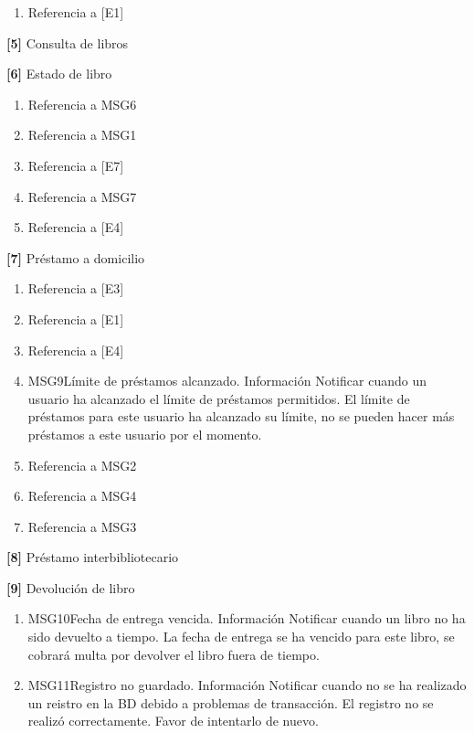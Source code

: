 \begin{Citemize}
\begin{enumerate}
			\item Referencia a [E1]	
		\end{enumerate}
	\item {\bf [5]} Consulta de libros
	\item {\bf [6]} Estado de libro
		\begin{enumerate}
			\item Referencia a MSG6
			\item Referencia a MSG1
			\item Referencia a [E7]
			\item Referencia a MSG7
			\item Referencia a [E4]
		\end{enumerate}
	\item {\bf [7]} Préstamo a domicilio
		\begin{enumerate}
			\item Referencia a [E3]
			\item Referencia a [E1]
			\item Referencia a [E4]
			\item
			\begin{Message}{MSG9}{Límite de préstamos alcanzado.}
				\MSGitem[Tipo: ] Información
				\MSGitem[Objetivo: ] Notificar cuando un usuario ha alcanzado el límite de préstamos permitidos.
				\MSGitem[Redacción: ] El límite de préstamos para este usuario ha alcanzado su límite, no se pueden hacer más préstamos a este usuario por el momento.
			\end{Message}
			
			\item Referencia a MSG2
			\item Referencia a MSG4
			\item Referencia a MSG3
		\end{enumerate}
	\item {\bf [8]} Préstamo interbibliotecario
	\item {\bf [9]} Devolución de libro
		\begin{enumerate}
			\item
			\begin{Message}{MSG10}{Fecha de entrega vencida.}
				\MSGitem[Tipo: ] Información
				\MSGitem[Objetivo: ] Notificar cuando un libro no ha sido devuelto a tiempo.
				\MSGitem[Redacción: ] La fecha de entrega se ha vencido para este libro, se cobrará multa por devolver el libro fuera de tiempo.
			\end{Message}
			
			\item
			\begin{Message}{MSG11}{Registro no guardado.}
				\MSGitem[Tipo: ] Información
				\MSGitem[Objetivo: ] Notificar cuando no se ha realizado un reistro en la BD debido a problemas de transacción.
				\MSGitem[Redacción: ] El registro no se realizó correctamente. Favor de intentarlo de nuevo.
			\end{Message}
			

\end{enumerate}
\end{Citemize}
